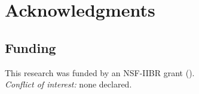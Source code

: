 \section*{Acknowledgments}


\subsection*{Funding}
This research was funded by an NSF-IIBR grant ().\\

\noindent \textit{Conflict of interest:} none declared.

\printbibliography

\nolinenumbers


